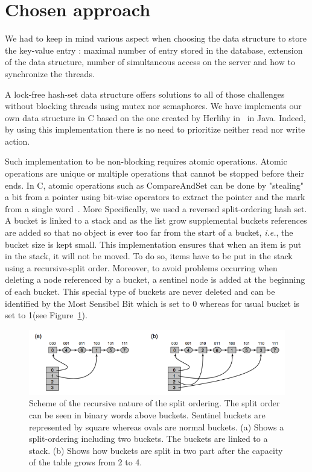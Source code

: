 \documentclass[a4paper,11pt]{report}
\begin{document}
    \section*{Chosen approach}

    We had to keep in mind various aspect when choosing the data structure to
    store the key-value entry : maximal number of entry stored in the database,
    extension of the data structure, number of simultaneous access on the server and
    how to synchronize the threads.

    A lock-free hash-set data structure offers solutions to all of those challenges without blocking threads using mutex
    nor semaphores. We have implements our own data structure in C based on the one created by Herlihy in~\cite{Herlihy2006}
    in Java. Indeed, by using this implementation there is no need to prioritize neither read nor write action.

    Such implementation to be non-blocking requires atomic operations. Atomic operations are unique or multiple operations
    that cannot be stopped before their ends. In C, atomic operations such as CompareAndSet can be done by "stealing" a
    bit from a pointer using bit-wise operators to extract the pointer and the mark from a single word~\cite{Herlihy2006}.
    More Specifically, we used a reversed split-ordering hash set. A bucket is linked to a stack and as the list grow
    supplemental buckets references are added so that no object is ever too far from the start of a bucket, \textit{i.e.},
    the bucket size is kept small. This implementation ensures that when an item is put in the stack, it will not be
    moved. To do so, items have to be put in the stack using a recursive-split order. Moreover, to avoid
    problems occurring when deleting a node referenced by a bucket, a sentinel node is added at the beginning of each
    bucket. This special type of buckets are never deleted and can be identified by the Most Sensibel Bit which is set
    to 0 whereas for usual bucket is set to 1(see Figure~\ref{fig:Fig1}).

    \begin{figure}[h]
        \centering
            \includegraphics{images/hashsetFig1.png}
        \caption{Scheme of the recursive nature of the split ordering.
        The split order can be seen in binary words above buckets.
        Sentinel buckets are represented by square whereas ovals are normal buckets.
        (a) Shows a split-ordering including two buckets. The buckets are linked to a stack.
        (b) Shows how buckets are split in two part after the capacity of the table grows from 2 to 4.}
        \label{fig:Fig1}
    \end{figure}
\end{document}

